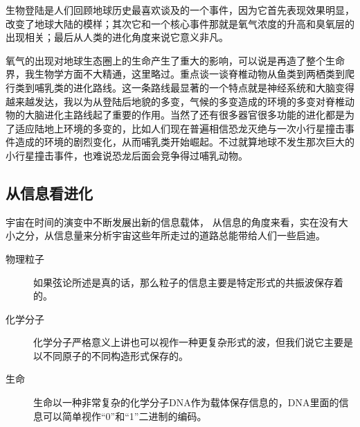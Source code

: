 \documentclass[12pt]{exam}%
\begin{document}
生物登陆是人们回顾地球历史最喜欢谈及的一个事件，因为它首先表现效果明显，改变了地球大陆的模样；其次它和一个核心事件那就是氧气浓度的升高和臭氧层的出现相关；最后从人类的进化角度来说它意义非凡。

氧气的出现对地球生态圈上的生命产生了重大的影响，可以说是再造了整个生命界，我生物学方面不大精通，这里略过。重点谈一谈脊椎动物从鱼类到两栖类到爬行类到哺乳类的进化路线。这一条路线最显著的一个特点就是神经系统和大脑变得越来越发达，我以为从登陆后地貌的多变，气候的多变造成的环境的多变对脊椎动物的大脑进化主路线起了重要的作用。当然了还有很多器官很多功能的进化都是为了适应陆地上环境的多变的，比如人们现在普遍相信恐龙灭绝与一次小行星撞击事件造成的环境的剧烈变化，从而哺乳类开始崛起。不过就算地球不发生那次巨大的小行星撞击事件，也难说恐龙后面会竞争得过哺乳动物。


\subsection{从信息看进化}
宇宙在时间的演变中不断发展出新的信息载体， 从信息的角度来看，实在没有大小之分，从信息量来分析宇宙这些年所走过的道路总能带给人们一些启迪。

\begin{description}
\item[物理粒子] 如果弦论所述是真的话，那么粒子的信息主要是特定形式的共振波保存着的。
\item[化学分子] 化学分子严格意义上讲也可以视作一种更复杂形式的波，但我们说它主要是以不同原子的不同构造形式保存的。
\item[生命] 生命以一种非常复杂的化学分子DNA作为载体保存信息的，DNA里面的信息可以简单视作“0”和“1”二进制的编码。
\end{description}
\end{document}
